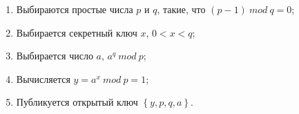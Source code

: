 \begin{enumerate}
\item Выбираются простые числа $p$ и $q$, такие, что $(p - 1) \ mod \ q = 0$;
\item Выбирается секретный ключ $x$, $0 < x < q$;
\item Выбирается число $a$, $a^q \ mod \ p$;
\item Вычисляется $y = a^x \ mod \ p = 1$;
\item Публикуется открытый ключ $\left\{y, p, q, a\right\}$.
\end{enumerate}